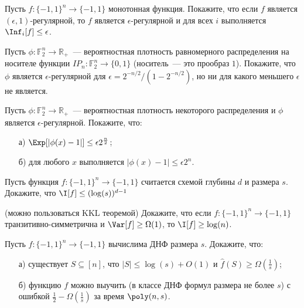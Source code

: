 
\begin{task}
	Пусть $f: \{-1, 1\}^{n} \to \{-1, 1\}$ монотонная функция. Покажите, что если $f$ является $(\epsilon, 1)$-регулярной, то $f$
    является $\epsilon$-регулярной и для всех $i$ выполняется $\Inf_i[f] \le \epsilon$.
\end{task}

\begin{task}
    Пусть $\phi: \mathbb{F}_2^n \to \mathbb{R}_+$~--- вероятностная плотность
    равномерного распределения на носителе функции $IP_n: \mathbb{F}_2^n \to \{0,
    1\}$ (носитель~--- это прообраз $1$). Покажите, что $\phi$ является
    $\epsilon$-регулярной для $\epsilon = 2^{-n / 2}/(1 - 2^{-n / 2})$, но ни для
    какого меньшего $\epsilon$ не является.
\end{task}


\begin{task}
    Пусть $\phi: \mathbb{F}_2^n \to \mathbb{R}_+$~--- вероятностная плотность некоторого распределения и $\phi$ является
    $\epsilon$-регулярной. Покажите, что:
    \begin{enumerate}[topsep = 0pt, itemsep = -1ex]
        \item [а)] $\Exp[|\phi(x) - 1|] \le \epsilon 2^{\frac{n}{2}}$;
        \item [б)] для любого $x$ выполняется $|\phi(x) - 1| \le \epsilon 2^{n}$.
	\end{enumerate}
\end{task}




\breakline

\begin{ptask}{25}
    Пусть функция $f: \{-1, 1\}^n \to \{-1, 1\}$ считается схемой глубины $d$ и размера $s$. Докажите, что $\I[f] \le
    (\log(s))^{d - 1}$
\end{ptask}

\begin{ptask}{26}(можно пользоваться KKL теоремой)
    Докажите, что если $f:\{-1, 1\}^n \to \{-1, 1\}$ транзитивно-симметрична и $\Var[f] \ge \Omega(1)$, то $\I[f] \ge \log(n)$. 
\end{ptask}


\begin{ptask}{27}
    Пусть $f:\{-1, 1\}^n \to \{-1, 1\}$ вычислима ДНФ размера $s$. Докажите, что:
   	\begin{enumerate}[topsep = 0pt, itemsep = -1ex]
        \item [а)] существует $S \subseteq [n]$, что $|S| \le \log(s) + O(1)$ и $\hat{f}(S) \ge \Omega(\frac{1}{s})$;
        \item [б)] функцию $f$ можно выучить (в классе ДНФ формул размера не более $s$) с ошибкой $\frac{1}{2} -
            \Omega(\frac{1}{s})$ за время $\poly(n, s)$.
	\end{enumerate}
\end{ptask}





